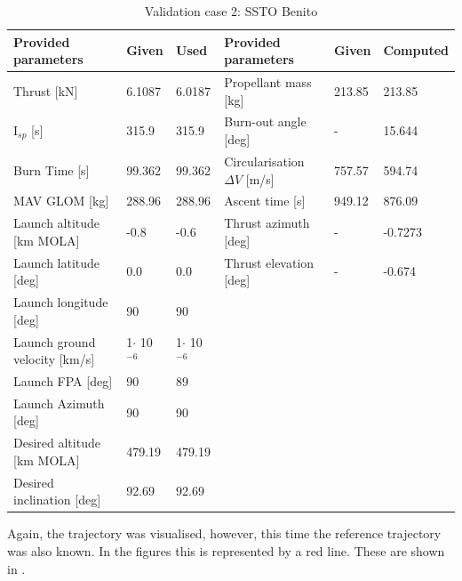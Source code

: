 \begin{table}[H]
\begin{center}
\caption{Validation case 2: \ac{SSTO} Benito}
\label{tab:validationCaseBenito}
\begin{tabular}{|l|l|l||l||l|l|}
\hline 
\textbf{Provided parameters} & \textbf{Given} & \textbf{Used} & \textbf{Provided parameters} & \textbf{Given} & \textbf{Computed} \\ \hline \hline
Thrust [kN] & 6.1087 & 6.0187 & Propellant mass [kg] & 213.85 & 213.85 \\ \hline
I$_{sp}$ [s] & 315.9 & 315.9 & Burn-out angle [deg] & - & 15.644 \\ \hline
Burn Time [s] & 99.362 & 99.362 & Circularisation $\Delta V$ [m/s] & 757.57 & 594.74 \\ \hline
\ac{MAV} \ac{GLOM} [kg] & 288.96 & 288.96 & Ascent time [s] & 949.12 & 876.09 \\ \hline
Launch altitude [km \ac{MOLA}] & -0.8 & -0.6 & Thrust azimuth [deg] & - & -0.7273 \\ \hline
Launch latitude [deg] & 0.0 & 0.0 & Thrust elevation [deg] & - & -0.674 \\ \hline
Launch longitude [deg] & 90 & 90 & & & \\ \hline
Launch ground velocity [km/s] & 1$\cdot $ 10$^{-6}$ & 1$\cdot $ 10$^{-6}$ & & & \\ \hline
Launch \ac{FPA} [deg] & 90 & 89 & & & \\ \hline
Launch Azimuth [deg] & 90 & 90 & & & \\ \hline
Desired altitude [km \ac{MOLA}] & 479.19 & 479.19 & & & \\ \hline
Desired inclination [deg] & 92.69 & 92.69 & & & \\ \hline




\end{tabular}
\end{center}
\end{table}

Again, the trajectory was visualised, however, this time the reference trajectory was also known. In the figures this is represented by a red line. These are shown in .





